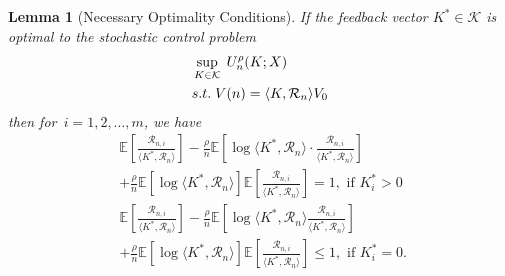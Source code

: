 \documentclass[10pt,a4paper]{amsart}
\newtheorem{lemma}{Lemma}
\begin{document}
\begin{lemma}[Necessary Optimality Conditions] \label{Lemma: risk term}
    If the feedback vector $K^* \in \mathcal{K}$ is optimal to the stochastic control problem
\begin{align} 
    \begin{aligned} \label{problem: risk-sensitive problem}
        &\sup_{K \in \mathcal{K}}\; U_n^\rho (K; X)\\
        &{\rm s.t. } \; V(n) = \langle K, \mathcal{R}_n \rangle V_0 
    \end{aligned}
\end{align}
    then for~$i=1,2,\ldots,m$, we have
    \begin{align*}
        & \mathbb{E}\left[ \frac{ \mathcal{R}_{n,i} }{ \langle K^{*}, \mathcal{R}_n \rangle } \right] 
        - \frac{\rho}{n} \mathbb{E}\left[ \log \langle K^{*}, \mathcal{R}_n \rangle \cdot \frac{\mathcal{R}_{n,i}}{ \langle K^{*}, \mathcal{R}_n \rangle } \right] \\
        & +\frac{\rho}{n} \mathbb{E} \left[ \log \langle K^{*}, \mathcal{R}_n \rangle \right] \mathbb{E}\left[ \frac{\mathcal{R}_{n,i}}{\langle K^{*}, \mathcal{R}_n \rangle } \right] = 1, \text{ if $K_i^* > 0$ }
    \end{align*}
    \begin{align*}
         & \mathbb{E}\left[ \frac{\mathcal{R}_{n,i}}{\langle K^{*}, \mathcal{R}_n \rangle } \right] - \frac{\rho}{n}\mathbb{E}\left[ \log \langle K^{*}, \mathcal{R}_n \rangle \frac{\mathcal{R}_{n,i}}{\langle K^{*}, \mathcal{R}_n\rangle} \right] \\
        & +\frac{\rho}{n}\mathbb{E}\left[ \log \langle K^{*}, \mathcal{R}_n \rangle \right] \mathbb{E}\left[ \frac{\mathcal{R}_{n,i}}{ \langle K^{*}, \mathcal{R}_n \rangle } \right] \leq 1, \text{ if $K_i^* = 0$. }
    \end{align*}
\end{lemma}
\end{document}
